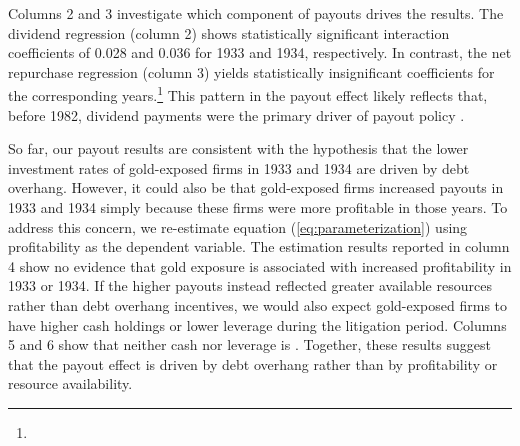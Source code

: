 Columns 2 and 3 investigate which component of payouts drives the results. The dividend regression (column 2) shows statistically significant interaction coefficients of 0.028 and 0.036 for 1933 and 1934, respectively. In contrast, the net repurchase regression (column 3) yields statistically insignificant coefficients for the corresponding years.\footnote{} This pattern in the payout effect likely reflects that, before 1982, dividend payments were the primary driver of payout policy \citep[e.g.,][]{Michaely2002, Skinner2008}.

So far, our payout results are consistent with the hypothesis that the lower investment rates of gold-exposed firms in 1933 and 1934 are driven by debt overhang. However, it could also be that gold-exposed firms increased payouts in 1933 and 1934 simply because these firms were more profitable in those years. To address this concern, we re-estimate equation (\ref{eq:parameterization}) using profitability as the dependent variable. The estimation results reported in column 4 show no evidence that gold exposure is associated with increased profitability in 1933 or 1934. If the higher payouts instead reflected greater available resources rather than debt overhang incentives, we would also expect gold-exposed firms to have higher cash holdings or lower leverage during the litigation period. Columns 5 and 6 show that neither cash nor leverage is . Together, these results suggest that the payout effect is driven by debt overhang rather than by profitability or resource availability.

